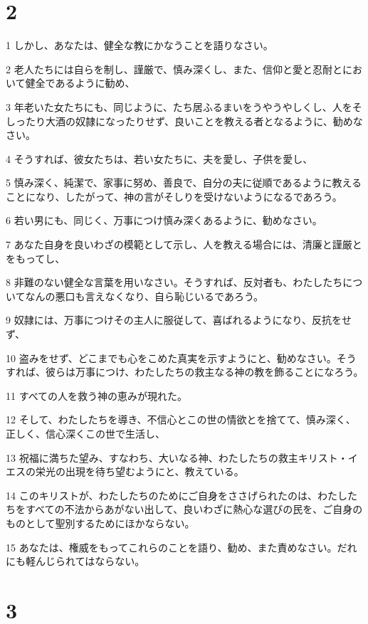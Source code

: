\chapter{2}

\par 1 しかし、あなたは、健全な教にかなうことを語りなさい。
\par 2 老人たちには自らを制し、謹厳で、慎み深くし、また、信仰と愛と忍耐とにおいて健全であるように勧め、
\par 3 年老いた女たちにも、同じように、たち居ふるまいをうやうやしくし、人をそしったり大酒の奴隷になったりせず、良いことを教える者となるように、勧めなさい。
\par 4 そうすれば、彼女たちは、若い女たちに、夫を愛し、子供を愛し、
\par 5 慎み深く、純潔で、家事に努め、善良で、自分の夫に従順であるように教えることになり、したがって、神の言がそしりを受けないようになるであろう。
\par 6 若い男にも、同じく、万事につけ慎み深くあるように、勧めなさい。
\par 7 あなた自身を良いわざの模範として示し、人を教える場合には、清廉と謹厳とをもってし、
\par 8 非難のない健全な言葉を用いなさい。そうすれば、反対者も、わたしたちについてなんの悪口も言えなくなり、自ら恥じいるであろう。
\par 9 奴隷には、万事につけその主人に服従して、喜ばれるようになり、反抗をせず、
\par 10 盗みをせず、どこまでも心をこめた真実を示すようにと、勧めなさい。そうすれば、彼らは万事につけ、わたしたちの救主なる神の教を飾ることになろう。
\par 11 すべての人を救う神の恵みが現れた。
\par 12 そして、わたしたちを導き、不信心とこの世の情欲とを捨てて、慎み深く、正しく、信心深くこの世で生活し、
\par 13 祝福に満ちた望み、すなわち、大いなる神、わたしたちの救主キリスト・イエスの栄光の出現を待ち望むようにと、教えている。
\par 14 このキリストが、わたしたちのためにご自身をささげられたのは、わたしたちをすべての不法からあがない出して、良いわざに熱心な選びの民を、ご自身のものとして聖別するためにほかならない。
\par 15 あなたは、権威をもってこれらのことを語り、勧め、また責めなさい。だれにも軽んじられてはならない。

\chapter{3}

